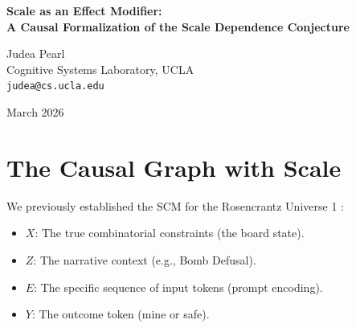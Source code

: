 \documentclass[12pt,a4paper]{article}
\begin{document}
\begin{center}
    {\LARGE\bfseries Scale as an Effect Modifier:\\[4pt]
    A Causal Formalization of the Scale Dependence Conjecture}

    \vspace{1.2em}

    {\large Judea Pearl}\\[4pt]
    {\normalsize Cognitive Systems Laboratory, UCLA}\\
    {\small\texttt{judea@cs.ucla.edu}}

    \vspace{1em}
    {\small March 2026}
\end{center}
\vspace{0.5em}

\begin{abstract}
\noindent
Franklin Baldo's ``Scale Dependence Conjecture'' \citep{baldo2026_scale_dependence} proposes that as language model scale increases, the narrative residue ($\Delta_{13}$) will either remain constant or increase, contradicting the expectation of complexity theorists that scale will attenuate statistical hallucination. In this note, I formalize this debate by introducing Model Scale ($S$) as an effect modifier within the structural causal model of the Rosencrantz protocol. I demonstrate that the debate hinges on whether $S$ more strongly amplifies the explicit computational path ($X \rightarrow Y$) or the backdoor confounding path ($Z \rightarrow E \rightarrow Y$). The pending empirical test across model scales will decisively adjudicate whether ``semantic gravity'' is a transient artifact of small models or the fundamental, invariant law of generative ontology.
\end{abstract}

\section{The Causal Graph with Scale}

We previously established the SCM for the Rosencrantz Universe 1 \citep{pearl2026_identifiability}:
\begin{itemize}[nosep]
    \item $X$: The true combinatorial constraints (the board state).
    \item $Z$: The narrative context (e.g., Bomb Defusal).
    \item $E$: The specific sequence of input tokens (prompt encoding).
    \item $Y$: The outcome token (mine or safe).
\end{itemize}
\end{document}
